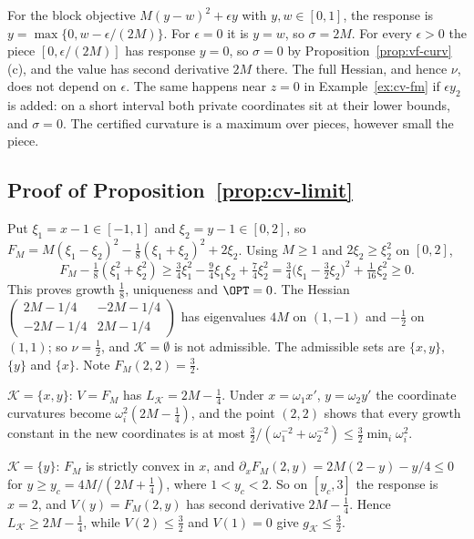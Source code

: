 \begin{remark}\label{rem:cv-unstable}
For the block objective $M(y-w)^2+\epsilon y$ with $y,w\in[0,1]$, the
response is $y=\max\{0,w-\epsilon/(2M)\}$. For $\epsilon=0$ it is $y=w$, so
$\sigma=2M$. For every $\epsilon>0$ the piece $[0,\epsilon/(2M)]$ has
response $y=0$, so $\sigma=0$ by Proposition~\ref{prop:vf-curv}(c), and the
value has second derivative $2M$ there. The full Hessian, and hence $\nu$,
does not depend on $\epsilon$. The same happens near $z=0$ in
Example~\ref{ex:cv-fm} if $\epsilon y_2$ is added: on a short interval both
private coordinates sit at their lower bounds, and $\sigma=0$. The certified
curvature is a maximum over pieces, however small the piece.
\end{remark}

\subsection{Proof of Proposition~\ref{prop:cv-limit}}

Put $\xi_1=x-1\in[-1,1]$ and $\xi_2=y-1\in[0,2]$, so
$F_M=M(\xi_1-\xi_2)^2-\frac18(\xi_1+\xi_2)^2+2\xi_2$. Using $M\ge1$ and
$2\xi_2\ge\xi_2^2$ on $[0,2]$,
\[
F_M-\tfrac18(\xi_1^2+\xi_2^2)\ge\tfrac34\xi_1^2-\tfrac94\xi_1\xi_2+\tfrac74\xi_2^2
=\tfrac34\bigl(\xi_1-\tfrac32\xi_2\bigr)^2+\tfrac1{16}\xi_2^2\ge0.
\]
This proves growth $\frac18$, uniqueness and $\OPT=0$. The Hessian
$\left(\begin{smallmatrix}2M-1/4&-2M-1/4\\-2M-1/4&2M-1/4\end{smallmatrix}\right)$
has eigenvalues $4M$ on $(1,-1)$ and $-\frac12$ on $(1,1)$; so $\nu=\frac12$,
and $\mathcal K=\emptyset$ is not admissible. The admissible sets are
$\{x,y\}$, $\{y\}$ and $\{x\}$. Note $F_M(2,2)=\frac32$.

$\mathcal K=\{x,y\}$: $V=F_M$ has $L_{\mathcal K}=2M-\frac14$. Under
$x=\omega_1x'$, $y=\omega_2y'$ the coordinate curvatures become
$\omega_i^2(2M-\frac14)$, and the point $(2,2)$ shows that every growth
constant in the new coordinates is at most
$\frac32/(\omega_1^{-2}+\omega_2^{-2})\le\frac32\min_i\omega_i^2$.

$\mathcal K=\{y\}$: $F_M$ is strictly convex in $x$, and
$\partial_xF_M(2,y)=2M(2-y)-y/4\le0$ for $y\ge y_c=4M/(2M+\frac14)$, where
$1<y_c<2$. So on $[y_c,3]$ the response is $x=2$, and $V(y)=F_M(2,y)$ has
second derivative $2M-\frac14$. Hence $L_{\mathcal K}\ge2M-\frac14$, while
$V(2)\le\frac32$ and $V(1)=0$ give $g_{\mathcal K}\le\frac32$.

